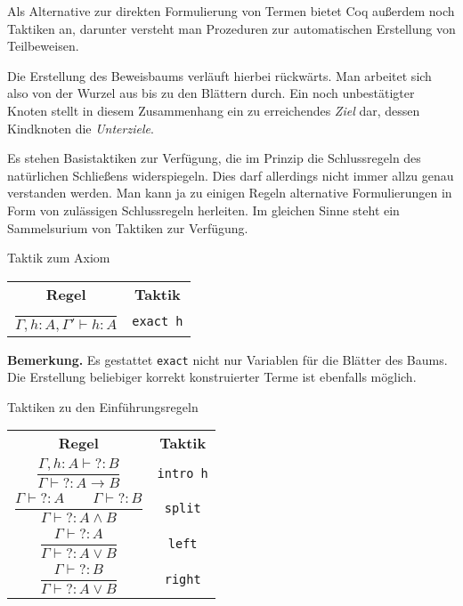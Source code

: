\documentclass[8pt]{beamer}
\newcommand{\strong}[1]{\textsf{\textbf{#1}}}
\newcommand{\parspace}{\vspace{0.8em}}
\newcommand{\unres}{{?}}
\begin{document}
\begin{frame}
Als Alternative zur direkten Formulierung von Termen bietet Coq
außerdem noch Taktiken an, darunter versteht man Prozeduren zur
automatischen Erstellung von Teilbeweisen.\pause

\parspace
Die Erstellung des Beweisbaums verläuft hierbei rückwärts.
Man arbeitet sich also von der Wurzel aus bis zu den Blättern durch.
Ein noch unbestätigter Knoten stellt in diesem Zusammenhang ein zu
erreichendes \emph{Ziel} dar, dessen Kindknoten die \emph{Unterziele}.

\parspace
Es stehen Basistaktiken zur Verfügung, die im Prinzip die Schlussregeln
des natürlichen Schließens widerspiegeln. Dies darf allerdings nicht
immer allzu genau verstanden werden. Man kann ja zu einigen Regeln
alternative Formulierungen in Form von zulässigen Schlussregeln herleiten.
Im gleichen Sinne steht ein Sammelsurium von Taktiken zur Verfügung.
\end{frame}

\begin{frame}
\begin{block}{Taktik zum Axiom}
\begin{center}
\begin{tabular}{c@{\qquad\quad}c}
\strong{Regel} & \strong{Taktik}\\[6pt]
$\dfrac{}{\Gamma, h\colon A, \Gamma'\vdash h\colon A}$
& \texttt{exact h}
\end{tabular}
\end{center}
\end{block}
\begin{footnotesize}
\strong{Bemerkung.} Es gestattet \texttt{exact} nicht nur Variablen
für die Blätter des Baums. Die Erstellung
beliebiger korrekt konstruierter Terme ist ebenfalls möglich.
\end{footnotesize}
\end{frame}

\begin{frame}
\begin{block}{Taktiken zu den Einführungsregeln}
\begin{center}
\begin{tabular}{c@{\qquad\quad}c}
\strong{Regel} & \strong{Taktik}\\[6pt]
$\dfrac{\Gamma, h\colon A\vdash\unres\colon B}{\Gamma\vdash\unres\colon A\to B}$
& \texttt{intro h}\\[14pt]
$\dfrac{\Gamma\vdash\unres\colon A\qquad\Gamma\vdash\unres\colon B}
  {\Gamma\vdash\unres\colon A\land B}$
& \texttt{split}\\[14pt]
$\dfrac{\Gamma\vdash\unres\colon A}{\Gamma\vdash\unres\colon A\lor B}$
& \texttt{left}\\[14pt]
$\dfrac{\Gamma\vdash\unres\colon B}{\Gamma\vdash\unres\colon A\lor B}$
& \texttt{right}
\end{tabular}
\end{center}
\end{block}
\end{frame}
\end{document}
